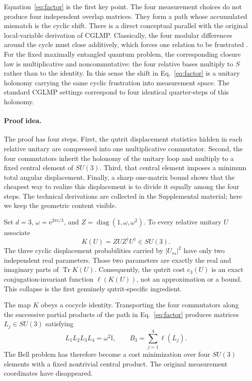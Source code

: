 \documentclass[aps,prl,reprint,superscriptaddress,nofootinbib]{revtex4-2}
\newcommand{\Tr}{\operatorname{Tr}}
\newcommand{\diag}{\operatorname{diag}}
\newcommand{\e}{\mathrm{e}}
\newcommand{\id}{\mathbb{I}}
\begin{document}
Equation~\eqref{eq:factor} is the first key point. The four measurement choices do not produce four independent overlap matrices. They form a path whose accumulated mismatch is the cyclic shift. There is a direct conceptual parallel with the original local-variable derivation of CGLMP. Classically, the four modular differences around the cycle must close additively, which forces one relation to be frustrated \cite{CGLMP}. For the fixed maximally entangled quantum problem, the corresponding closure law is multiplicative and noncommutative: the four relative bases multiply to $S$ rather than to the identity. In this sense the shift in Eq.~\eqref{eq:factor} is a unitary holonomy carrying the same cyclic frustration into measurement space. The standard CGLMP settings correspond to four identical quarter-steps of this holonomy.

\paragraph{Proof idea.}
The proof has four steps. First, the qutrit displacement statistics hidden in each relative unitary are compressed into one multiplicative commutator. Second, the four commutators inherit the holonomy of the unitary loop and multiply to a fixed central element of $SU(3)$. Third, that central element imposes a minimum total angular displacement. Finally, a sharp one-matrix bound shows that the cheapest way to realize this displacement is to divide it equally among the four steps. The technical derivations are collected in the Supplemental material; here we keep the geometric content visible.

Set $d=3$, $\omega=\e^{2\pi i/3}$, and $Z=\diag(1,\omega,\omega^2)$. To every relative unitary $U$ associate
\begin{equation}
K(U)=ZUZ^\dagger U^\dagger\in SU(3).
\label{eq:K}
\end{equation}
The three cyclic displacement probabilities carried by $|U_{rs}|^2$ have only two independent real parameters. Those two parameters are exactly the real and imaginary parts of $\Tr K(U)$. Consequently, the qutrit cost $c_3(U)$ is an exact conjugation-invariant function $\ell(K(U))$, not an approximation or a bound. This collapse is the first genuinely qutrit-specific ingredient.

The map $K$ obeys a cocycle identity. Transporting the four commutators along the successive partial products of the path in Eq.~\eqref{eq:factor} produces matrices $L_j\in SU(3)$ satisfying
\begin{equation}
L_1L_2L_3L_4=\omega^2\id,
\qquad B_3=\sum_{j=1}^{4}\ell(L_j).
\label{eq:central}
\end{equation}
The Bell problem has therefore become a cost minimization over four $SU(3)$ elements with a fixed nontrivial central product. The original measurement coordinates have disappeared.
\end{document}
